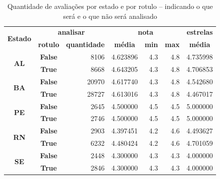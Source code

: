 \begin{table}[h]
	\centering
	\begin{tabular}{|c|crrrrr|}
		\hline
		\multicolumn{1}{|c|}{\multirow{2}{*}{\textbf{Estado}}} &
		\multicolumn{2}{c|}{\textbf{analisar}}                 &
		\multicolumn{3}{c|}{\textbf{nota}}                     &
		\multicolumn{1}{c|}{\textbf{estrelas}}                                                                            \\ \cline{2-7}
		\multicolumn{1}{|l|}{}                                 &
		\multicolumn{1}{c}{\textbf{rotulo}}                    &
		\multicolumn{1}{c|}{\textbf{quantidade}}               &
		\multicolumn{1}{c}{\textbf{média}}                     &
		\multicolumn{1}{c}{\textbf{min}}                       &
		\multicolumn{1}{c|}{\textbf{max}}                      &
		\multicolumn{1}{c|}{\textbf{média}}                                                                               \\ \hline
		\multirow{2}{*}{\textbf{AL}}                           & \textbf{False} & 8106  & 4.623896 & 4.3 & 4.8 & 4.735998 \\
		                                                       & \textbf{True}  & 8668  & 4.643205 & 4.3 & 4.8 & 4.706853 \\ \hline
		\multirow{2}{*}{\textbf{BA}}                           & \textbf{False} & 20970 & 4.617740 & 4.3 & 4.8 & 4.542680 \\
		                                                       & \textbf{True}  & 28727 & 4.613016 & 4.3 & 4.8 & 4.467017 \\ \hline
		\multirow{2}{*}{\textbf{PE}}                           & \textbf{False} & 2645  & 4.500000 & 4.5 & 4.5 & 5.000000 \\
		                                                       & \textbf{True}  & 2746  & 4.500000 & 4.5 & 4.5 & 5.000000 \\ \hline
		\multirow{2}{*}{\textbf{RN}}                           & \textbf{False} & 2903  & 4.397451 & 4.2 & 4.6 & 4.493627 \\
		                                                       & \textbf{True}  & 6232  & 4.480424 & 4.2 & 4.6 & 4.701059 \\ \hline
		\multirow{2}{*}{\textbf{SE}}                           & \textbf{False} & 2448  & 4.300000 & 4.3 & 4.3 & 4.000000 \\
		                                                       & \textbf{True}  & 2846  & 4.300000 & 4.3 & 4.3 & 4.000000 \\ \hline
	\end{tabular}\caption{Quantidade de avaliações por estado e por rotulo -- indicando o que será e o que não será analisado}
	\label{table:distribuicao_review_por_estado}
\end{table}

